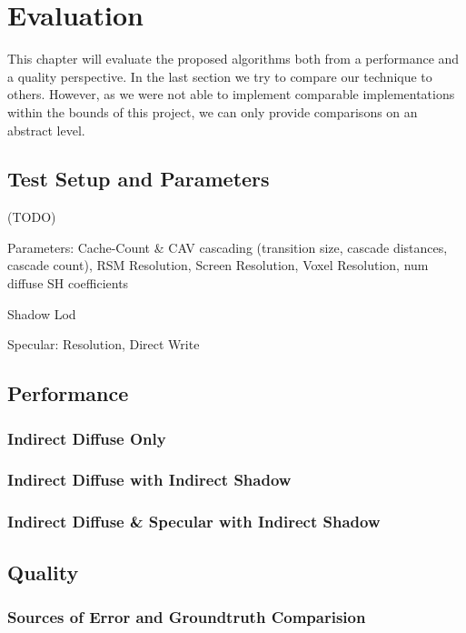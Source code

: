\documentclass[thesis.tex]{subfiles}
\begin{document}
\chapter{Evaluation}\label{chap:eva}
This chapter will evaluate the proposed algorithms both from a performance and a quality perspective.
In the last section we try to compare our technique to others.
However, as we were not able to implement comparable implementations within the bounds of this project, we can only provide comparisons on an abstract level.

\section{Test Setup and Parameters}

(TODO)

Parameters:
Cache-Count \& CAV cascading (transition size, cascade distances, cascade count),
RSM Resolution,
Screen Resolution,
Voxel Resolution,
num diffuse SH coefficients

Shadow Lod

Specular:
Resolution, Direct Write



\section{Performance}

\subsection{Indirect Diffuse Only}

\subsection{Indirect Diffuse with Indirect Shadow}

\subsection{Indirect Diffuse \& Specular with Indirect Shadow}

\newpage

\section{Quality}

\subsection{Sources of Error and Groundtruth Comparision}
\end{document}
